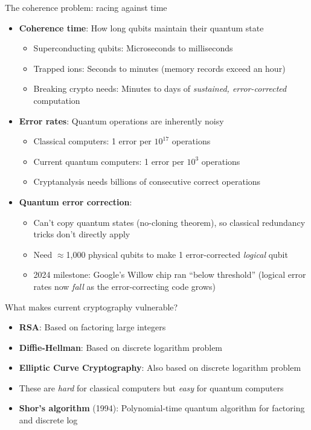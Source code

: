 \ifdefined\PRESENTATION\else\PassOptionsToClass{handout}{beamer}\fi\documentclass[aspectratio=169, lualatex]{beamer}
\begin{document}
\begin{frame}{The coherence problem: racing against time}
	\begin{itemize}
		\item \textbf{Coherence time}: How long qubits maintain their quantum state
		      \begin{itemize}
			      \item Superconducting qubits: Microseconds to milliseconds
			      \item Trapped ions: Seconds to minutes (memory records exceed an hour)
			      \item Breaking crypto needs: Minutes to days of \textit{sustained, error-corrected} computation
		      \end{itemize}
		\item \textbf{Error rates}: Quantum operations are inherently noisy
		      \begin{itemize}
			      \item Classical computers: 1 error per $10^{17}$ operations
			      \item Current quantum computers: 1 error per $10^{3}$ operations
			      \item Cryptanalysis needs billions of consecutive correct operations
		      \end{itemize}
		\item \textbf{Quantum error correction}:
		      \begin{itemize}
			      \item Can't copy quantum states (no-cloning theorem), so classical redundancy tricks don't directly apply
			      \item Need $\approx$1,000 physical qubits to make 1 error-corrected \textit{logical} qubit
			      \item 2024 milestone: Google's Willow chip ran ``below threshold'' (logical error rates now \textit{fall} as the error-correcting code grows)
		      \end{itemize}
	\end{itemize}
\end{frame}

\begin{frame}{What makes current cryptography vulnerable?}
	\begin{itemize}
		\item \textbf{RSA}: Based on factoring large integers
		\item \textbf{Diffie-Hellman}: Based on discrete logarithm problem
		\item \textbf{Elliptic Curve Cryptography}: Also based on discrete logarithm problem
		\item These are \textit{hard} for classical computers but \textit{easy} for quantum computers
		\item \textbf{Shor's algorithm} (1994): Polynomial-time quantum algorithm for factoring and discrete log
	\end{itemize}
\end{frame}
\end{document}
